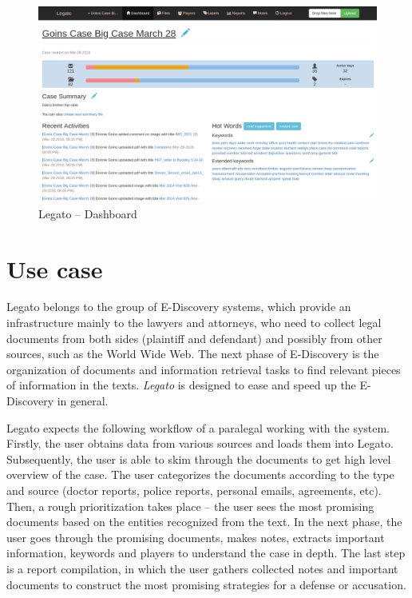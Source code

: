 \documentclass[
  digital, %
  notable,   %
  nolof,     %
  nolot,     %
  draft
]{fithesis3}
\begin{document}
\begin{figure}[h]
\caption{Legato -- Dashboard}
\label{fig:legato_dashboard}
\includegraphics[width=\textwidth]{img/Legato-Dashboard}
\end{figure}


\section{Use case}
\label{sec:legato_usecase}
Legato belongs to the group of E-Discovery systems, which provide an infrastructure mainly to the lawyers and attorneys, who need to collect legal documents from both sides (plaintiff and defendant) and possibly from other sources, such as the World Wide Web.
The next phase of E-Discovery is the organization of documents and information retrieval tasks to find relevant pieces of information in the texts.
\textit{Legato} is designed to ease and speed up the E-Discovery in general.

Legato expects the following workflow of a paralegal working with the system.
Firstly, the user obtains data from various sources and loads them into Legato.
Subsequently, the user is able to skim through the documents to get high level overview of the case.
The user categorizes the documents according to the type and source (doctor reports, police reports, personal emails, agreements, etc).
Then, a rough prioritization takes place -- the user sees the most promising documents based on the entities recognized from the text.
In the next phase, the user goes through the promising documents, makes notes, extracts important information, keywords and players to understand the case in depth.
The last step is a report compilation, in which the user gathers collected notes and important documents to construct the most promising strategies for a defense or accusation.
\end{document}
